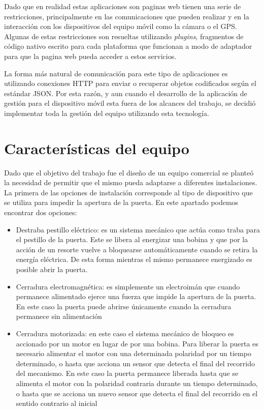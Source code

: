 Dado que en realidad estas aplicaciones son paginas web tienen una serie de restricciones, principalmente en las comunicaciones que pueden realizar y en la interacción con los dispositivos del equipo móvil como la cámara o el GPS. Algunas de estas restricciones son resueltas utilizando \emph{plugins}, fragmentos de código nativo escrito para cada plataforma que funcionan a modo de adaptador para que la pagina web pueda acceder a estos servicios.

La forma más natural de comunicación para este tipo de aplicaciones es utilizando conexiones HTTP para enviar o recuperar objetos codificados según el estándar JSON. Por esta razón, y aun cuando el desarrollo de la aplicación de gestión para el dispositivo móvil esta fuera de los alcances del trabajo, se decidió implementar toda la gestión del equipo utilizando esta tecnología.

\section{Características del equipo}
\label{sec:Caracteristicas}

Dado que el objetivo del trabajo fue el diseño de un equipo comercial se planteó la necesidad de permitir que el mismo pueda adaptarse a diferentes instalaciones. La primera de las opciones de instalación corresponde al tipo de dispositivo que se utiliza para impedir la apertura de la puerta. En este apartado podemos encontrar dos opciones:

\begin{itemize}
	\item Destraba pestillo eléctrico: es un sistema mecánico que actúa como traba para el pestillo de la puerta. Este se libera al energizar una bobina y que por la acción de un resorte vuelve a bloquearse automáticamente cuando se retira la energía eléctrica. De esta forma mientras el mismo permanece energizado es posible abrir la puerta.
	
	\item Cerradura electromagnética: es simplemente un electroimán que cuando permanece alimentado ejerce una fuerza que impide la apertura de la puerta. En este caso la puerta puede abrirse únicamente cuando la cerradura permanece sin alimentación
	
	\item Cerradura motorizada: en este caso el sistema mecánico de bloqueo es accionado por un motor en lugar de por una bobina. Para liberar la puerta es necesario alimentar el motor con una determinada polaridad por un tiempo determinado, o hasta que acciona un sensor que detecta el final del recorrido del mecanismo. En este caso la puerta permanece liberada hasta que se alimenta el motor con la polaridad contraria durante un tiempo determinado, o hasta que se acciona un nuevo sensor que detecta el final del recorrido en el sentido contrario al inicial
\end{itemize}

